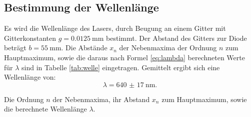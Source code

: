 \subsection{Bestimmung der Wellenlänge}

Es wird die Wellenlänge des Lasers, durch Beugung an einem Gitter mit Gitterkonstanten $g=\SI{0.0125}{\milli\metre}$ bestimmt. Der Abstand des Gitters zur Diode beträgt $b=\SI{55}{\milli\metre}$. Die Abstände $x_n$ der Nebenmaxima der Ordnung $n$ zum Hauptmaximum, sowie die daraus nach Formel \eqref{eq:lambda} berechneten Werte für $\lambda$ sind in Tabelle \ref{tab:welle} eingetragen.
Gemittelt ergibt sich eine Wellenlänge von:
\[
\lambda = \SI{640(17)}{\nano\metre} \text{.}
\] 

\begin{table}
	\centering
	\caption{Die Ordnung $n$ der Nebenmaxima, ihr Abstand $x_n$ zum Hauptmaximum, sowie die berechnete Wellenlänge $\lambda$.}
	
	\label{tab:welle}
\end{table}